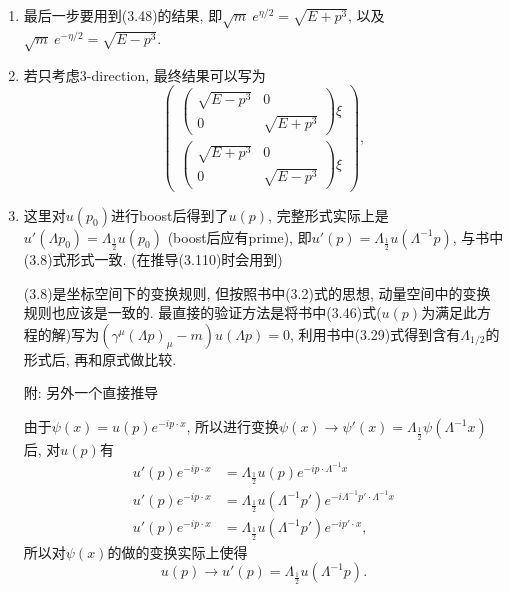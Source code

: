 \documentclass[cn,hazy,blue,11pt,device=normal,chinesefont=founder]{elegantnote}
\begin{document}
\begin{enumerate}
  \item 最后一步要用到(3.48)的结果, 即$\sqrt{m}\ e^{\eta/2} = \sqrt{E + p^3}$, 以及$\sqrt{m}\ e^{-\eta/2} = \sqrt{E - p^3}$. 
  \item 若只考虑3-direction, 最终结果可以写为
  \begin{equation}
    \left( \begin{array}{c} \left( \begin{array}{cc} \sqrt{E-p^3} & 0 \\ 0 & \sqrt{E+p^3} \end{array} \right)\xi \\ \left( \begin{array}{cc} \sqrt{E+p^3} & 0 \\ 0 & \sqrt{E-p^3} \end{array} \right)\xi \end{array} \right), 
  \end{equation}
  \item 这里对$u(p_0)$进行boost后得到了$u(p)$, 完整形式实际上是$u'(\Lambda p_0) = \Lambda_{\frac{1}{2}}u(p_0)$ (boost后应有prime), 即$u'(p) = \Lambda_{\frac{1}{2}}u(\Lambda^{-1}p)$, 与书中(3.8)式形式一致. (在推导(3.110)时会用到)
  \begin{note}
    (3.8)是坐标空间下的变换规则, 但按照书中(3.2)式的思想, 动量空间中的变换规则也应该是一致的. 最直接的验证方法是将书中(3.46)式($u(p)$为满足此方程的解)写为$(\gamma^\mu(\Lambda p)_\mu - m)u(\Lambda p) = 0$, 利用书中(3.29)式得到含有$\Lambda_{1/2}$的形式后, 再和原式做比较. 

    \mbox{}

    附: 另外一个直接推导

    由于$\psi(x) = u(p)e^{-ip\cdot x}$, 所以进行变换$\psi(x) \rightarrow \psi'(x) = \Lambda_{\frac{1}{2}}\psi(\Lambda^{-1}x)$后, 对$u(p)$有
    \begin{equation}
      \begin{aligned}
        u'(p)e^{-ip\cdot x} &= \Lambda_{\frac{1}{2}}u(p)e^{-ip\cdot \Lambda^{-1}x} \\
        u'(p)e^{-ip\cdot x} &= \Lambda_{\frac{1}{2}}u(\Lambda^{-1}p')e^{-i\Lambda^{-1}p'\cdot \Lambda^{-1}x} \\
        u'(p)e^{-ip\cdot x} &= \Lambda_{\frac{1}{2}}u(\Lambda^{-1}p')e^{-ip'\cdot x}, 
      \end{aligned}
    \end{equation}
    所以对$\psi(x)$的做的变换实际上使得
    \begin{equation}
      u(p) \rightarrow u'(p) = \Lambda_{\frac{1}{2}}u(\Lambda^{-1}p). 
    \end{equation}
  \end{note}
\end{enumerate}
\end{document}
